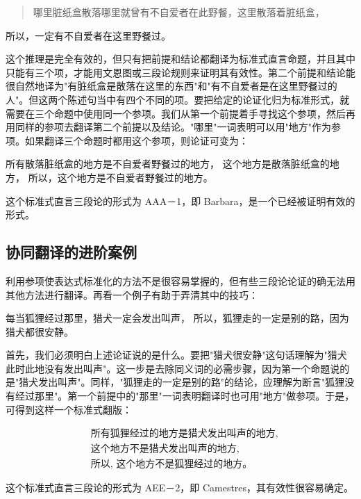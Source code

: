 \begin{quote}
哪里脏纸盒散落哪里就曾有不自爱者在此野餐，这里散落着脏纸盒，
\end{quote}

所以，一定有不自爱者在这里野餐过。

这个推理是完全有效的，但只有把前提和结论都翻译为标准式直言命题，并且其中只能有三个项，才能用文恩图或三段论规则来证明其有效性。第二个前提和结论能很自然地译为"有脏纸盒是散落在这里的东西"和"有不自爱者是在这里野餐过的人"。但这两个陈述句当中有四个不同的项。要把给定的论证化归为标准形式，就需要在三个命题中使用同一个参项。我们从第一个前提着手寻找这个参项，然后再用同样的参项去翻译第二个前提以及结论。"哪里"一词表明可以用"地方"作为参项。如果翻译三个命题时都用这个参项，则论证可变为：

所有散落脏纸盒的地方是不自爱者野餐过的地方，
这个地方是散落脏纸盒的地方，
所以，这个地方是不自爱者野餐过的地方。

这个标准式直言三段论的形式为 AAA－1，即 Barbara，是一个已经被证明有效的形式。

\subsection{协同翻译的进阶案例}

利用参项使表达式标准化的方法不是很容易掌握的，但有些三段论论证的确无法用其他方法进行翻译。再看一个例子有助于弄清其中的技巧：

每当狐狸经过那里，猎犬一定会发出叫声，
所以，狐狸走的一定是别的路，因为猎犬都很安静。

首先，我们必须明白上述论证说的是什么。要把"猎犬很安静"这句话理解为"猎犬此时此地没有发出叫声"。这一步是去除同义词的必需步骤，因为第一个命题说的是"猎犬发出叫声"。同样，"狐狸走的一定是别的路"的结论，应理解为断言"狐狸没有经过那里"。第一个前提中的"那里"一词表明翻译时也可用"地方"做参项。于是，可得到这样一个标准式翻版：

$$
\begin{aligned}
& \text { 所有狐狸经过的地方是猎犬发出叫声的地方, } \\
& \text { 这个地方不是猎犬发出叫声的地方, } \\
& \text { 所以, 这个地方不是狐狸经过的地方。 }
\end{aligned}
$$

这个标准式直言三段论的形式为 AEE－2，即 Camestres，其有效性很容易确定。

